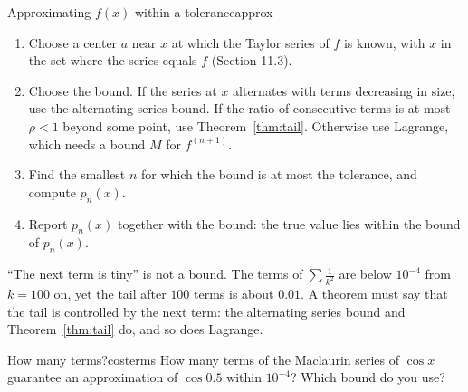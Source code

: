 \documentclass[11pt]{article}
\begin{document}
\begin{proc}{Approximating $f(x)$ within a tolerance}{approx}
\begin{enumerate}[nosep]
  \item Choose a center $a$ near $x$ at which the Taylor series of $f$ is known, with $x$ in the set where the series equals $f$ (Section 11.3).
  \item Choose the bound. If the series at $x$ alternates with terms decreasing in size, use the alternating series bound. If the ratio of consecutive terms is at most $\rho<1$ beyond some point, use Theorem~\ref{thm:tail}. Otherwise use Lagrange, which needs a bound $M$ for $f^{(n+1)}$.
  \item Find the smallest $n$ for which the bound is at most the tolerance, and compute $p_n(x)$.
  \item Report $p_n(x)$ together with the bound: the true value lies within the bound of $p_n(x)$.
\end{enumerate}
\end{proc}

\begin{warn}
``The next term is tiny'' is not a bound. The terms of $\sum\frac1{k^2}$ are below $10^{-4}$ from $k=100$ on, yet the tail after $100$ terms is about $0.01$. A theorem must say that the tail is controlled by the next term: the alternating series bound and Theorem~\ref{thm:tail} do, and so does Lagrange.
\end{warn}

\begin{kc}{How many terms?}{costerms}
How many terms of the Maclaurin series of $\cos x$ guarantee an approximation of $\cos0.5$ within $10^{-4}$? Which bound do you use?
\end{kc}
\end{document}
